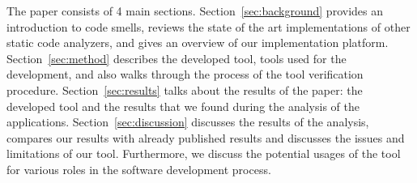 The paper consists of 4 main sections.
Section~\ref{sec:background} provides an introduction to code smells, reviews the state of the art implementations
of other static code analyzers, and gives an overview of our implementation platform.
Section~\ref{sec:method} describes the developed tool, tools used for the development, and also walks through
the process of the tool verification procedure.
Section~\ref{sec:results} talks about the results of the paper: the developed tool and the results that we found
during the analysis of the applications.
Section~\ref{sec:discussion} discusses the results of the analysis, compares our results with already published results and
discusses the issues and limitations of our tool.
Furthermore, we discuss the potential usages of the tool for various roles in the software development process.
